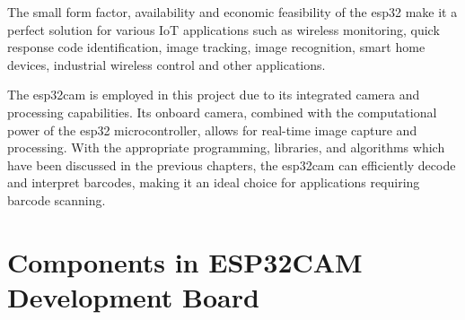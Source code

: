 The small form factor, availability and economic feasibility of the \ac{esp32} make it a perfect solution for various IoT applications such as wireless monitoring, quick response code identification, image tracking, image recognition, smart home devices, industrial wireless control and other applications.

\medskip

The \ac{esp32cam} is employed in this project due to its integrated camera and processing capabilities. Its onboard camera, combined with the computational power of the \ac{esp32} microcontroller, allows for real-time image capture and processing. With the appropriate programming, libraries, and algorithms which have been discussed in the previous chapters, the \ac{esp32cam} can efficiently decode and interpret barcodes, making it an ideal choice for applications requiring barcode scanning.

\section{Components in ESP32CAM Development Board}



